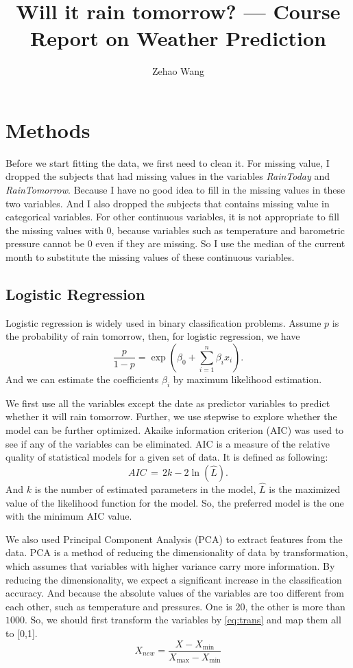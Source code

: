 \documentclass[11pt, a4paper, jou]{apa7}
\title{Will it rain tomorrow? --- Course Report on Weather Prediction}
\author{Zehao Wang}
\begin{document}
\maketitle
\section{Methods}
Before we start fitting the data, we first need to clean it. For missing value, I dropped the subjects that had missing values in the variables \emph{RainToday} and \emph{RainTomorrow}. Because I have no good idea to fill in the missing values in these two variables. And I also dropped the subjects that contains missing value in categorical variables. For other continuous variables, it is not appropriate to fill the missing values with $0$, because variables such as temperature and barometric pressure cannot be $0$ even if they are missing. So I use the median of the current month to substitute the missing values of these continuous variables. 
\subsection{Logistic Regression}
    Logistic regression\cite{Berkson1944} is widely used in binary classification problems. Assume $p$ is the probability of rain tomorrow, then, for logistic regression, we have
    \begin{equation}
        \frac{p}{1-p}=\exp\left(\beta_0+\sum_{i=1}^{n}\beta_i x_i\right). 
    \end{equation}
    And we can estimate the coefficients $\beta_i$ by maximum likelihood estimation. 

    We first use all the variables except the date as predictor variables to predict whether it will rain tomorrow. Further, we use stepwise to explore whether the model can be further optimized. Akaike information criterion (AIC)\cite{Akaike1974} was used to see if any of the variables can be eliminated. AIC is a measure of the relative quality of statistical models for a given set of data. It is defined as following: 
    \begin{equation}
        \label{eq:AIC}
        {AIC} \,=\,2k-2\ln({\hat {L}}). 
    \end{equation}
    And $k$ is the number of estimated parameters in the model, $\hat{L}$ is the maximized value of the likelihood function for the model. So, the preferred model is the one with the minimum AIC value. 

    We also used Principal Component Analysis (PCA)\cite{Pearson1901} to extract features from the data. PCA is a method of reducing the dimensionality of data by transformation, which assumes that variables with higher variance carry more information. By reducing the dimensionality, we expect a significant increase in the classification accuracy. And because the absolute values of the variables are too different from each other, such as temperature and pressures. One is $20$, the other is more than $1000$. So, we should first transform the variables by \ref{eq:trans} and map them all to [0,1]. 
    \begin{equation}
        \label{eq:trans}
        X_{new} = \frac{X - X_{\min}}{X_{\max}- X_{\min}}
    \end{equation}
\end{document}
